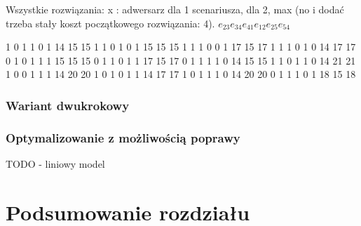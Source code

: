 Wszystkie rozwiązania: x : adwersarz dla 1 scenariusza, dla 2, max (no i dodać trzeba stały koszt początkowego rozwiązania: 4).
$e_{23}	e_{34}	e_{41}	e_{12}	e_{25}	e_{54}$

1		0		1		1		0		1		14		15		15
1		1		0		1		0		1		15		15		15
1		1		1		0		0		1		17		15		17
1		1		1		0		1		0		14		17		17
0		1		0		1		1		1		15		15		15
0		1		1		0		1		1		17		15		17
0		1		1		1		1		0		14		15		15
1		1		0		1		1		0		14		21		21
1		0		0		1		1		1		14		20		20
1		0		1		0		1		1		14		17		17
1		0		1		1		1		0		14		20		20
0		1		1		1		0		1		18		15		18


\subsubsection{Wariant dwukrokowy}

\subsubsection{Optymalizowanie z możliwością poprawy}

TODO - liniowy model \label{mod:lpmodel1}

\section{Podsumowanie rozdziału}
